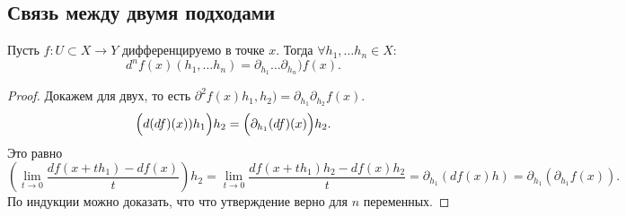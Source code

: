 \subsection{Связь между двумя подходами}
\begin{thm}
    Пусть $ f \colon U \subset X \to  Y$ дифференцируемо  в точке $ x$. 
    Тогда  $ \forall h_1, \ldots h_n \in X\colon $
    \[
	d^{n}f(x) (h_1, \ldots h_n) = \partial _{  h_1} \ldots \partial _{h_n})f(x)
    .\] 
\end{thm}
\begin{proof}
    Докажем для двух, то есть $ \partial ^2f(x) h_1, h_2) = \partial _{h_1} \partial _{h_2}f(x)$.
    \[
    \Bigl(	d(df)(x))h_1\Bigr) h_2 = \Bigl(\partial _{h_1} (df) (x) \Bigr)h_2
    .\] 
    Это равно
    \[
	\left(   \lim_{t \to  0}  \frac{df(x+ th_1) - df(x)}{t}\right) h_2 = \lim_{t \to  0} \frac{df(x+th_1)h_2 - df(x)h_2}{t} = \partial _{h_1}\left( df(x) h \right) = \partial _{h_1} \left( \partial _{h_1} f(x) \right) 
    .\] 
    По индукции можно доказать, что что утверждение верно для $ n$ переменных.
\end{proof}
